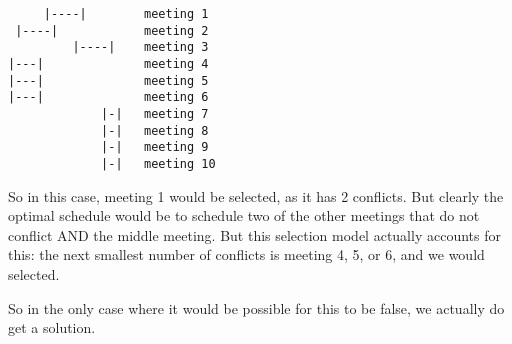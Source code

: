 \documentclass[a4paper]{article}
\begin{document}
\begin{verbatim}
     |----|        meeting 1
 |----|            meeting 2
         |----|    meeting 3
|---|              meeting 4
|---|              meeting 5
|---|              meeting 6
             |-|   meeting 7
             |-|   meeting 8
             |-|   meeting 9
             |-|   meeting 10
\end{verbatim}

So in this case, meeting 1 would be selected, as it has 2 conflicts. But clearly the optimal schedule would be to schedule two of the other meetings that do not conflict AND the middle meeting. But this selection model actually accounts for this: the next smallest number of conflicts is meeting 4, 5, or 6, and we would selected.

So in the only case where it would be possible for this to be false, we actually do get a solution.
\end{document}
